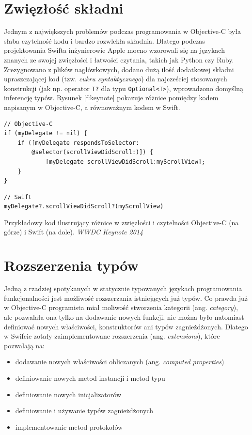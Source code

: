 \documentclass[mgr, shortabstract]{iithesis}
\newcommand{\ang}[1]{ang. \textit{#1}}
\begin{document}
\section{Zwięzłość składni}
\label{s:zwiezlosc_skladni}

Jednym z największych problemów podczas programowania w Objective-C była słaba czytelność kodu i bardzo rozwlekła składnia. Dlatego podczas projektowania Swifta inżynierowie Apple mocno wzorowali się na językach znanych ze swojej zwięzłości i łatwości czytania, takich jak Python czy Ruby. Zrezygnowano z plików nagłówkowych, dodano dużą ilość dodatkowej składni upraszczającej kod (tzw. \textit{cukru syntaktycznego}) dla najcześciej stosowanych konstrukcji (jak np. operator \texttt{T?} dla typu \texttt{Optional<T>}), wprowadzono domyślną inferencję typów. Rysunek \ref{f:keynote} pokazuje różnice pomiędzy kodem napisanym w Objective-C, a równoważnym kodem w Swift.

\begin{listing}[ht]
\begin{verbatim}
// Objective-C
if (myDelegate != nil) {
    if ([myDelegate respondsToSelector:
        @selector(scrollViewDidScroll:)]) {
            [myDelegate scrollViewDidScroll:myScrollView];
    }
}
\end{verbatim}

\begin{verbatim}
// Swift
myDelegate?.scrollViewDidScroll?(myScrollView)
\end{verbatim}
\caption{Przykładowy kod ilustrujący różnice w zwięzłości i czytelności Objective-C (na górze) i Swift (na dole). \textit{WWDC Keynote 2014}}
\label{f:keynote}
\end{listing}

\section{Rozszerzenia typów}
\label{s:rozszerzenia_typow}

Jedną z rzadziej spotykanych w statycznie typowanych językach programowania funkcjonalności jest możliwość rozszerzania istniejących już typów. Co prawda już w Objective-C programista miał moliwość stworzenia kategorii (\ang{category}), ale pozwalała ona tylko na dodawanie nowych funkcji, nie można było natomiast definiować nowych właściwości, konstruktorów ani typów zagnieżdżonych. Dlatego w Swifcie zotały zaimplementowane rozszerzenia (\ang{extensions}), które pozwalają na:

\begin{itemize}
    \item dodawanie nowych właściwości obliczanych (\ang{computed properties})
    \item definiowanie nowych metod instancji i metod typu
    \item definiowanie nowych inicjalizatorów
    \item definiowanie i używanie typów zagnieżdżonych
    \item implementowanie metod protokołów
\end{itemize}
\end{document}
